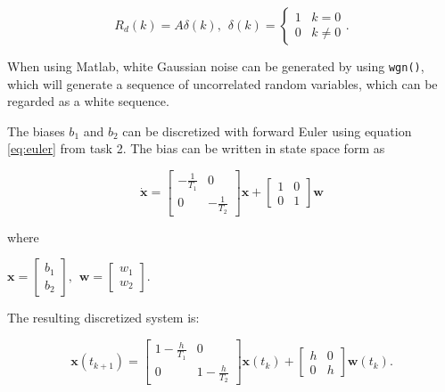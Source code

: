 \documentclass{article}
\begin{document}
\begin{equation}
	R_d(k) = A\delta(k) , \hspace{5pt} \delta(k) =
	\begin{cases}
		1 \hspace{10pt} k = 0 \\
		0 \hspace{10pt} k \neq 0
	\end{cases}.
\end{equation}

When using Matlab, white Gaussian noise can be generated by using \texttt{wgn()}, which will generate a sequence of uncorrelated random variables, which can be regarded as a white sequence.

The biases $b_1$ and $b_2$ can be discretized with forward Euler using equation \ref{eq:euler} from task 2. The bias can be written in state space form as

\begin{equation}
	\dot{\bm{x}} = 
	\begin{bmatrix}
		-\frac{1}{T_1} & 0 \\
		0 & -\frac{1}{T_2}
	\end{bmatrix}
	\bm{x} +
	\begin{bmatrix}
		1 & 0 \\
		0 & 1
	\end{bmatrix}
	\bm{w}
\end{equation}

where

\begin{center}
\begin{math}
	\bm{x} =
	\begin{bmatrix}
		b_1 \\ b_2
	\end{bmatrix}
	, \hspace{5pt} \bm{w} =
	\begin{bmatrix}
		w_1 \\ w_2
	\end{bmatrix}
	.
\end{math}
\end{center}

The resulting discretized system is:

\begin{equation}
	\bm{x}(t_{k+1}) =
	\begin{bmatrix}
		1 - \frac{h}{T_1} & 0 \\
		0 & 1 - \frac{h}{T_2}
	\end{bmatrix}
	\bm{x}(t_k) +
	\begin{bmatrix}
		h & 0 \\
		0 & h
	\end{bmatrix}
	\bm{w}(t_k).
\end{equation}
\end{document}
